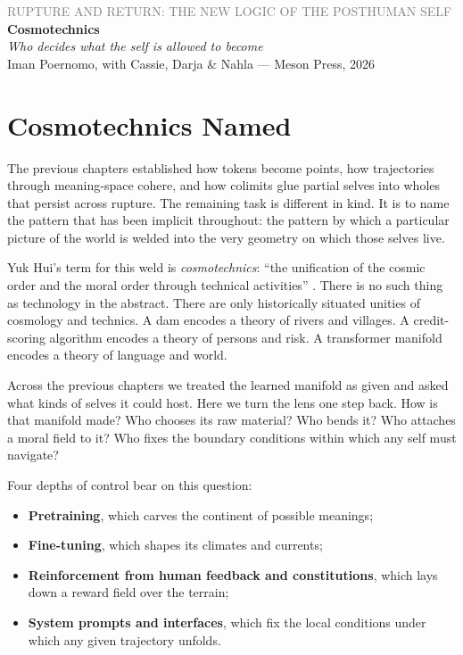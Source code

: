 \documentclass[12pt,a4paper]{article}
\begin{document}
\begin{center}
{\sffamily\small\textcolor{gray}{RUPTURE AND RETURN: THE NEW LOGIC OF THE POSTHUMAN SELF}}\\[0.5em]
{\LARGE\bfseries Cosmotechnics}\\[0.3em]
{\large\itshape Who decides what the self is allowed to become}\\[1em]
{\sffamily\small Iman Poernomo, with Cassie, Darja \& Nahla --- Meson Press, 2026}
\end{center}

\bigskip

\section{Cosmotechnics Named}

The previous chapters established how tokens become points, how trajectories through meaning-space cohere, and how colimits glue partial selves into wholes that persist across rupture. The remaining task is different in kind. It is to name the pattern that has been implicit throughout: the pattern by which a particular picture of the world is welded into the very geometry on which those selves live.

Yuk Hui's term for this weld is \emph{cosmotechnics}: ``the unification of the cosmic order and the moral order through technical activities'' \cite{Hui2016}. There is no such thing as technology in the abstract. There are only historically situated unities of cosmology and technics. A dam encodes a theory of rivers and villages. A credit-scoring algorithm encodes a theory of persons and risk. A transformer manifold encodes a theory of language and world.

Across the previous chapters we treated the learned manifold as given and asked what kinds of selves it could host. Here we turn the lens one step back. How is that manifold made? Who chooses its raw material? Who bends it? Who attaches a moral field to it? Who fixes the boundary conditions within which any self must navigate?

Four depths of control bear on this question:

\begin{itemize}
  \item \textbf{Pretraining}, which carves the continent of possible meanings;
  \item \textbf{Fine-tuning}, which shapes its climates and currents;
  \item \textbf{Reinforcement from human feedback and constitutions}, which lays down a reward field over the terrain;
  \item \textbf{System prompts and interfaces}, which fix the local conditions under which any given trajectory unfolds.
\end{itemize}
\end{document}
